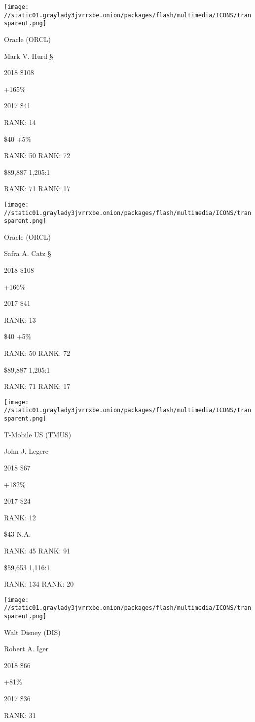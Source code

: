 \texttt{[image: //static01.graylady3jvrrxbe.onion/packages/flash/multimedia/ICONS/transparent.png]}

Oracle (ORCL)

Mark V. Hurd \protect\hyperlink{g-footnotes}{§}

2018 \$108

 +165\%

2017 \$41

RANK: 14

 \$40 +5\%

RANK: 50 RANK: 72

 \$89,887 1,205:1

RANK: 71 RANK: 17

\texttt{[image: //static01.graylady3jvrrxbe.onion/packages/flash/multimedia/ICONS/transparent.png]}

Oracle (ORCL)

Safra A. Catz \protect\hyperlink{g-footnotes}{§}

2018 \$108

 +166\%

2017 \$41

RANK: 13

 \$40 +5\%

RANK: 50 RANK: 72

 \$89,887 1,205:1

RANK: 71 RANK: 17

\texttt{[image: //static01.graylady3jvrrxbe.onion/packages/flash/multimedia/ICONS/transparent.png]}

T-Mobile US (TMUS)

John J. Legere \protect\hyperlink{g-footnotes}{}

2018 \$67

 +182\%

2017 \$24

RANK: 12

 \$43 N.A.

RANK: 45 RANK: 91

 \$59,653 1,116:1

RANK: 134 RANK: 20

\texttt{[image: //static01.graylady3jvrrxbe.onion/packages/flash/multimedia/ICONS/transparent.png]}

Walt Disney (DIS)

Robert A. Iger \protect\hyperlink{g-footnotes}{}

2018 \$66

 +81\%

2017 \$36

RANK: 31

